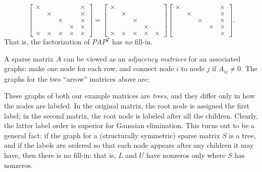 \documentclass[12pt, leqno]{article}
\begin{document}
\[
  \begin{bmatrix}
    \times &        &        &        & \times \\
           & \times &        &        & \times \\
           &        & \times &        & \times \\
           &        &        & \times & \times \\
    \times & \times & \times & \times & \times
  \end{bmatrix} =
  \begin{bmatrix}
    \times &        &        &        & \\
           & \times &        &        & \\
           &        & \times &        & \\
           &        &        & \times & \\
    \times & \times & \times & \times & \times
  \end{bmatrix}
  \begin{bmatrix}
    \times &        &        &        & \times \\
           & \times &        &        & \times \\
           &        & \times &        & \times \\
           &        &        & \times & \times \\
           &        &        &        & \times
  \end{bmatrix}.
\]
That is, the factorization of $PAP^T$ has {\em no} fill-in.

A sparse matrix $A$ can be viewed as an {\em adjacency matrices}
for an associated graphs: make one node for each row,
and connect node $i$ to node $j$ if $A_{ij} \neq 0$.  The graphs
for the two ``arrow'' matrices above are:
\begin{center}

\end{center}

These graphs of both our example matrices are {\em trees}, and they
differ only in how the nodes are labeled.  In the original matrix, the
root node is assigned the first label; in the second matrix, the root
node is labeled after all the children.  Clearly, the latter label
order is superior for Gaussian elimination.  This turns out to be a
general fact: if the graph for a (structurally symmetric) sparse
matrix $S$ is a tree, and if the labels are ordered so that each node
appears after any children it may have, then there is no fill-in: that
is, $L$ and $U$ have nonzeros only where $S$ has nonzeros.
\end{document}
